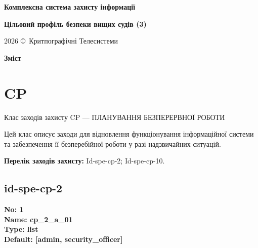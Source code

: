 \documentclass{article}
\newcommand\HUGE[1]{\fontsize{40}{40}\selectfont #1}
\begin{document}
\pagestyle{fancy}

\begin{titlepage}
  \AddToShipoutPictureBG*{\AtPageLowerLeft{\color{nato}\rule{\paperwidth}{\paperheight}}}
  \color{white}\thispagestyle{empty}\vspace*{4cm}\centering
  {\Huge  \textbf{Комплексна система захисту інформації} \par} \vspace{2cm}
  {\HUGE  \textbf{Цільовий профіль безпеки вищих судів (3)} \par} \vspace{2.5cm}
  \vfill
  {\large 2026 \copyright\ Критпографічні Телесистеми \par}
\end{titlepage}

\newpage

\begin{center}
  {\Huge\color{nato}\bfseries Зміст\par}
\end{center}
\vspace{40pt}
\tableofcontents

\begin{abstract}
Цільовий профіль безпеки (ЦПБ) — індивідуальний для конкретної системи підприємства. Саме на його основі створюється/модернізується КЗЗІ. Включає лише додаткові вимоги (відмінності) відносно Галузевого профілю.
\end{abstract}

\section{CP}
Клас заходів захисту CP --- ПЛАНУВАННЯ БЕЗПЕРЕРВНОЇ РОБОТИ

Цей клас описує заходи для відновлення функціонування інформаційної системи та забезпечення її безперебійної роботи у разі надзвичайних ситуацій.

\textbf{Перелік заходів захисту:} Id-spe-cp-2; Id-spe-cp-10.

\subsection{id-spe-cp-2}


\vspace{10pt}
{\footnotesize\bfseries
No: 1\\
Name: cp\_\allowbreak{}2\_\allowbreak{}a\_\allowbreak{}01\\
Type: list\\
Default: [\textquotedbl{}admin\textquotedbl{}, \textquotedbl{}security\_\allowbreak{}officer\textquotedbl{}]
}
\end{document}
